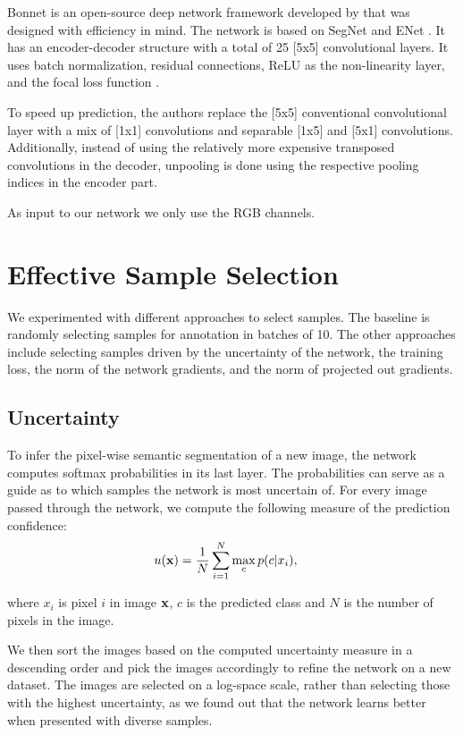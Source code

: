 Bonnet is an open-source deep network framework developed by \cite{milioto2018bonnet} that was designed with efficiency in mind. The network is based on SegNet \cite{badrinarayanan2017segnet} and ENet \cite{paszke2016enet}. It has an encoder-decoder structure with a total of 25 [5x5] convolutional layers. It uses batch normalization, residual connections, ReLU as the non-linearity layer, and the focal loss function \cite{DBLP:conf/iccv/LinGGHD17}.

To speed up prediction, the authors replace the [5x5] conventional convolutional layer with a mix of [1x1] convolutions and separable [1x5] and [5x1] convolutions. Additionally, instead of using the relatively more expensive transposed convolutions in the decoder, unpooling is done using the respective pooling indices in the encoder part.

As input to our network we only use the RGB channels.


\section{Effective Sample Selection}\label{sec:approach}

We experimented with different approaches to select samples. The baseline is randomly selecting samples for annotation in batches of 10. The other approaches include selecting samples driven by the uncertainty of the network, the training loss, the norm of the network gradients, and the norm of projected out gradients.   


\subsection{Uncertainty}

To infer the pixel-wise semantic segmentation of a new image, the network computes softmax probabilities in its last layer. The probabilities can serve as a guide as to which samples the network is most uncertain of. For every image passed through the network, we compute the following measure of the prediction confidence:
\begin{align}
u(\bold{x}) &= \frac{1}{N} \sum_{i=1}^N \max_c p(c|x_i),
\end{align}  

where $x_i$ is pixel $i$ in image $\bold{x}$, $c$ is the predicted class and $N$ is the number of pixels in the image.

We then sort the images based on the computed uncertainty measure in a descending order and pick the images accordingly to refine the network on a new dataset. The images are selected on a log-space scale, rather than selecting those with the highest uncertainty, as we found out that the network learns better when presented with diverse samples.

